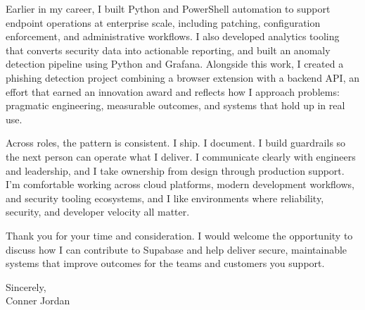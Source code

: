 \documentclass[letterpaper,11pt]{article}
\begin{document}
\vspace{16pt}

Earlier in my career, I built Python and PowerShell automation to support endpoint operations at enterprise scale, including patching, configuration enforcement, and administrative workflows. I also developed analytics tooling that converts security data into actionable reporting, and built an anomaly detection pipeline using Python and Grafana. Alongside this work, I created a phishing detection project combining a browser extension with a backend API, an effort that earned an innovation award and reflects how I approach problems: pragmatic engineering, measurable outcomes, and systems that hold up in real use.

\vspace{16pt}

Across roles, the pattern is consistent. I ship. I document. I build guardrails so the next person can operate what I deliver. I communicate clearly with engineers and leadership, and I take ownership from design through production support. I’m comfortable working across cloud platforms, modern development workflows, and security tooling ecosystems, and I like environments where reliability, security, and developer velocity all matter.

\vspace{16pt}

Thank you for your time and consideration. I would welcome the opportunity to discuss how I can contribute to Supabase and help deliver secure, maintainable systems that improve outcomes for the teams and customers you support.

\vspace{16pt}

Sincerely,\\
Conner Jordan
\end{document}
